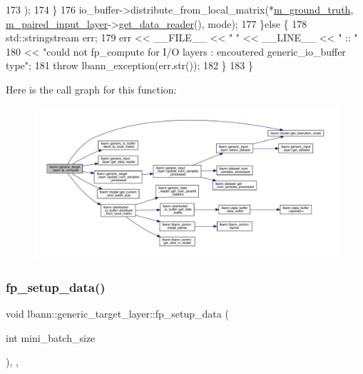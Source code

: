 \begin{DoxyCode}
173                               );
174       \}
176       io\_buffer->distribute\_from\_local\_matrix(*\hyperlink{classlbann_1_1generic__target__layer_acb9ba351caf22b8e2378e4cd1e256da7}{m\_ground\_truth}, 
      \hyperlink{classlbann_1_1generic__target__layer_a84da1260e9feb4fbc3e6f2315e4cab4b}{m\_paired\_input\_layer}->\hyperlink{classlbann_1_1generic__input__layer_a5715a966647e8cc92489f9e1950b2d28}{get\_data\_reader}(), mode);
177     \}\textcolor{keywordflow}{else} \{
178       std::stringstream err;
179       err << \_\_FILE\_\_ << \textcolor{stringliteral}{" "} << \_\_LINE\_\_ << \textcolor{stringliteral}{" :: "}
180           << \textcolor{stringliteral}{"could not fp\_compute for I/O layers : encoutered generic\_io\_buffer type"};
181       \textcolor{keywordflow}{throw} lbann\_exception(err.str());
182     \}
183   \}
\end{DoxyCode}
Here is the call graph for this function\+:\nopagebreak
\begin{figure}[H]
\begin{center}
\leavevmode
\includegraphics[width=350pt]{classlbann_1_1generic__target__layer_a57a60f5a28c9fb78d5151801123d4dba_cgraph}
\end{center}
\end{figure}
\mbox{\label{classlbann_1_1generic__target__layer_af89a8227784c005354bf937ec887a7ed}} 
\subsubsection{\texorpdfstring{fp\+\_\+setup\+\_\+data()}{fp\_setup\_data()}}
{\footnotesize\ttfamily void lbann\+::generic\+\_\+target\+\_\+layer\+::fp\+\_\+setup\+\_\+data (\begin{DoxyParamCaption}\item[{int}]{mini\+\_\+batch\+\_\+size }\end{DoxyParamCaption})\hspace{0.3cm}{\ttfamily [inline]}, {\ttfamily [override]}, {\ttfamily [virtual]}}

